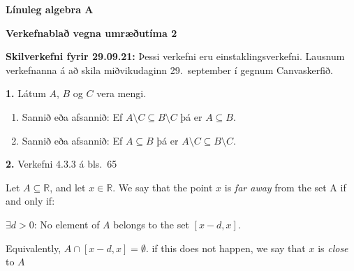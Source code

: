 \documentclass[12pt]{article}
\begin{document}
\pagestyle{empty}


\newcommand{\Ov}{\mbox{${\bf 0}$}}
\newcommand{\rv}{\mbox{${\bf r}$}}
\newcommand{\vv}{\mbox{${\bf v}$}}
\newcommand{\xv}{\mbox{${\bf x}$}}
\newcommand{\yv}{\mbox{${\bf y}$}}
\newcommand{\av}{\mbox{${\bf a}$}}
\newcommand{\bv}{\mbox{${\bf b}$}}
\newcommand{\cv}{\mbox{${\bf c}$}}
\newcommand{\iv}{\mbox{${\bf i}$}}
\newcommand{\jv}{\mbox{${\bf j}$}}
\newcommand{\kv}{\mbox{${\bf k}$}}

\newcommand{\ZZ}{\mbox{$\mathbb{Z}$}}
\newcommand{\NN}{\mbox{$\mathbb{N}$}}
\newcommand{\QQ}{\mbox{$\mathbb{Q}$}}
\newcommand{\RR}{\mbox{$\mathbb{R}$}}
\newcommand{\CC}{\mbox{$\mathbb{C}$}}

\newcommand{\RRk}{\mbox{$\mathbb{R}^k$}}
\newcommand{\RRn}{\mbox{$\mathbb{R}^n$}}
\newcommand{\RRm}{\mbox{$\mathbb{R}^m$}}

\centerline{\bf \Huge Línuleg algebra A}
\medskip
\centerline{\bf \Large Verkefnablað vegna umræðutíma 2}

\medskip

\bigskip
{\bf Skilverkefni fyrir 29.09.21:}  Þessi verkefni eru einstaklingsverkefni.  Lausnum verkefnanna á að skila miðvikudaginn 29.~september  í gegnum Canvaskerfið.

\smallskip

{\bf 1.}  Látum $A$, $B$ og $C$ vera mengi.  

\begin{enumerate}[label=(\alph*)]
	\item Sannið eða afsannið:  Ef $A\setminus C\subseteq B\setminus C$ þá er $A\subseteq B$.
	\item Sannið eða afsannið:  Ef $A\subseteq B$ þá er $A\setminus C\subseteq B\setminus C$.
\end{enumerate}

\smallskip

{\bf 2.}  Verkefni 4.3.3 á bls.~65

Let $A\subseteq \mathbb{R}$, and let $x\in \mathbb{R}$. We say that the point $x$ is \emph{far away} from the set A if and only if:

\qquad \qquad $\exists d >0$: No element of $A$ belongs to the set $[x-d,x]$.

Equivalently, $A\cap [x-d,x]=\emptyset $. if this does not happen, we say that $x$ is \emph{close} to $A$
\end{document}
